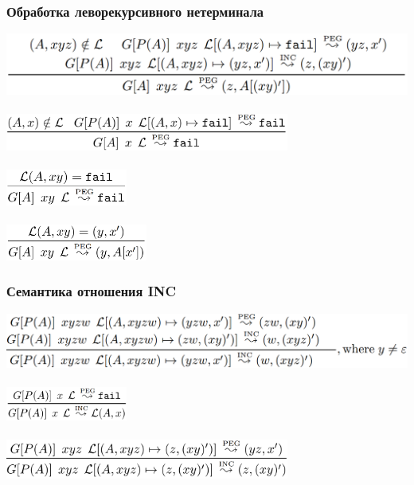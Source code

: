 \documentclass{beamer}
\begin{document}
\begin{frame}[fragile]
  \transwipe[direction=90]
  \frametitle{Обработка леворекурсивного нетерминала}
\begin{center}
  \includegraphics[width=1.0\textwidth]{pics/lvar1}  \\~\\     \pause
  \includegraphics[width=0.7\textwidth]{pics/lvar2}  \\~\\     \pause 
  \includegraphics[width=0.3\textwidth]{pics/lvar3}  \\~\\     \pause
  \includegraphics[width=0.35\textwidth]{pics/lvar4}  
\end{center}
\end{frame}

\begin{frame}[fragile]
  \transwipe[direction=90]
  \frametitle{Семантика отношения INC}
\begin{center}
  \includegraphics[width=1.0\textwidth]{pics/incr1}  \\~\\     \pause
  \includegraphics[width=0.3\textwidth]{pics/incr2}  \\~\\     \pause
  \includegraphics[width=0.7\textwidth]{pics/incr3}  
\end{center}
\end{frame}
\end{document}
